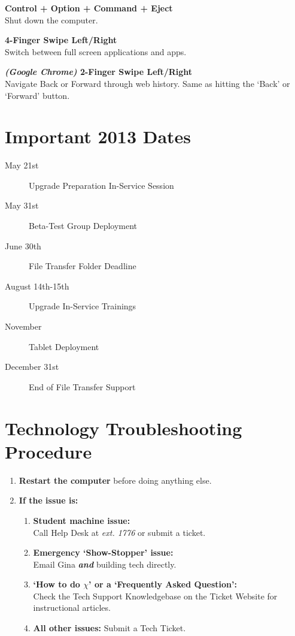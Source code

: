 \documentclass[10pt,foldmark,notumble]{leaflet}
\begin{document}
\textbf{Control + Option + Command + Eject}\\
Shut down the computer.

\textbf{4-Finger Swipe Left/Right}\\
Switch between full screen applications and apps. 

\textbf{\emph{(Google Chrome)} 2-Finger Swipe Left/Right}\\
Navigate Back or Forward through web history. Same as hitting the `Back' or `Forward' button.

\section{Important 2013 Dates\color{red}\hrulefill\color{black}}
\begin{description}
\item[May 21st] \dotfill Upgrade Preparation In-Service Session
\item[May 31st] \dotfill Beta-Test Group Deployment
\item[June 30th] \dotfill File Transfer Folder Deadline
\item[August 14th-15th] \dotfill Upgrade In-Service Trainings
\item[November] \dotfill Tablet Deployment
\item[December 31st] \dotfill End of File Transfer Support 
\end{description}

\section{Technology Troubleshooting Procedure\color{red}\hrulefill\color{black}}
\begin{enumerate}
\item \textbf{Restart the computer} before doing anything else.
\item \textbf{If the issue is:}
\begin{enumerate}
\item \textbf{Student machine issue:}\\Call Help Desk at \emph{ext. 1776} or submit a ticket.
\item \textbf{Emergency `Show-Stopper' issue:}\\Email Gina \textbf{\emph{and}} building tech directly.
\item \textbf{`How to do $\chi$' or a `Frequently Asked Question':}\\Check the Tech Support Knowledgebase on the Ticket Website for instructional articles.
\item \textbf{All other issues:} Submit a Tech Ticket.
\end{enumerate}
\end{enumerate}
\end{document}
